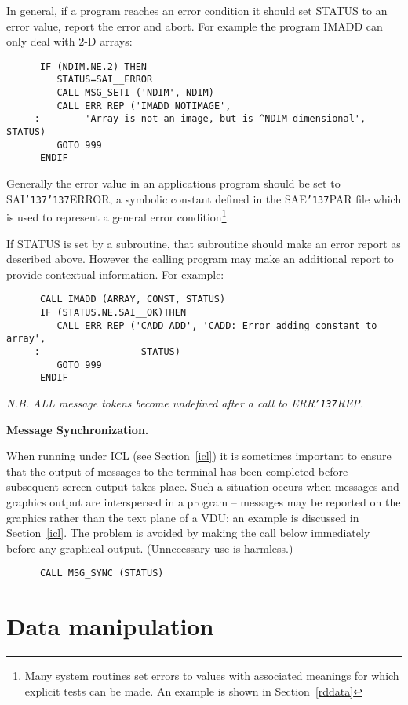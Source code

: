 \documentclass[twoside,11pt]{article}
\renewcommand{\_}{{\tt\char'137}}
\newcommand{\xlabel}[1]{}
\begin{document}
In general, if a program reaches an error condition it should set STATUS
to  an error value, report the error and abort.
For example the program IMADD can only deal with 2-D arrays:
\begin{verbatim}
      IF (NDIM.NE.2) THEN
         STATUS=SAI__ERROR
         CALL MSG_SETI ('NDIM', NDIM)
         CALL ERR_REP ('IMADD_NOTIMAGE',
     :        'Array is not an image, but is ^NDIM-dimensional', STATUS)
         GOTO 999
      ENDIF
\end{verbatim}
Generally the error value in an applications program should be set
to SAI\_\_ERROR, a symbolic
constant defined in the SAE\_PAR file which is used to represent a general
error condition\footnote{Many system routines set errors to
values with associated meanings for which explicit
tests can be made. An example is shown in Section~\ref{rddata}}.

If STATUS is set by a subroutine, that subroutine should make an error report
as described above. However the calling program may make an additional
report to provide contextual information.
For example:
\begin{verbatim}
      CALL IMADD (ARRAY, CONST, STATUS)
      IF (STATUS.NE.SAI__OK)THEN
         CALL ERR_REP ('CADD_ADD', 'CADD: Error adding constant to array',
     :                  STATUS)
         GOTO 999
      ENDIF
\end{verbatim}
{\sl N.B. ALL message tokens become undefined after a call to ERR\_REP.}

{\bigskip\large\bf Message Synchronization.}

When running under ICL (see Section~\ref{icl}) it is sometimes important
to ensure that the output of messages to the terminal has been completed
before subsequent screen output takes place.
Such a situation occurs when messages and graphics output are interspersed
in a program --
messages may be reported on the graphics rather than the text plane of a VDU;
an example is discussed in Section~\ref{icl}.
The problem is avoided by making the call below immediately before any
graphical output. (Unnecessary use is harmless.)
\begin{verbatim}
      CALL MSG_SYNC (STATUS)
\end{verbatim}

\newpage
\section{Data manipulation\label{add7}\xlabel{data_manipulation}}
\end{document}
